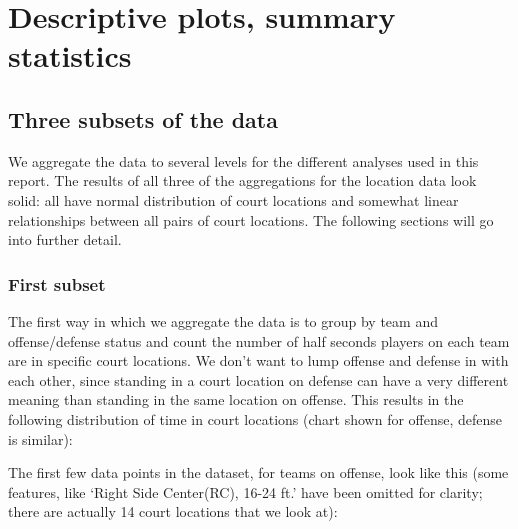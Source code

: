 \documentclass[]{article}
\begin{document}
\section{Descriptive plots, summary
statistics}\label{descriptive-plots-summary-statistics}

\subsection{Three subsets of the data}\label{three-subsets-of-the-data}

We aggregate the data to several levels for the different analyses used
in this report. The results of all three of the aggregations for the
location data look solid: all have normal distribution of court
locations and somewhat linear relationships between all pairs of court
locations. The following sections will go into further detail.

\subsubsection{First subset}\label{first-subset}

The first way in which we aggregate the data is to group by team and
offense/defense status and count the number of half seconds players on
each team are in specific court locations. We don't want to lump offense
and defense in with each other, since standing in a court location on
defense can have a very different meaning than standing in the same
location on offense. This results in the following distribution of time
in court locations (chart shown for offense, defense is similar):

The first few data points in the dataset, for teams on offense, look
like this (some features, like `Right Side Center(RC), 16-24 ft.' have
been omitted for clarity; there are actually 14 court locations that we
look at):
\end{document}
